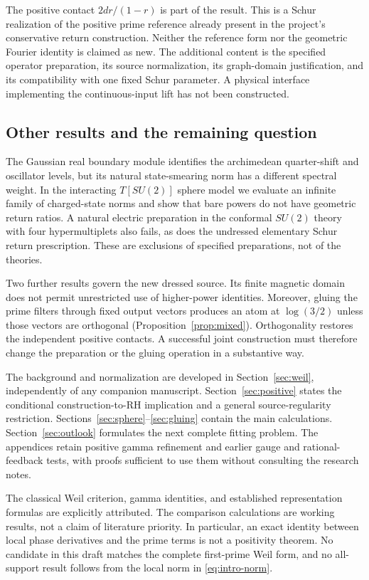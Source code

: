 The positive contact $2dr/(1-r)$ is part of the result. This is a Schur
realization of the positive prime reference already present in the
project's conservative return construction. Neither the reference form
nor the geometric Fourier identity is claimed as new. The additional
content is the specified operator preparation, its source normalization,
its graph-domain justification, and its compatibility with one fixed
Schur parameter. A physical interface implementing the continuous-input
lift has not been constructed.

\subsection{Other results and the remaining question}
The Gaussian real boundary module identifies the archimedean
quarter-shift and oscillator levels, but its natural state-smearing norm
has a different spectral weight. In the interacting $T[SU(2)]$ sphere
model we evaluate an infinite family of charged-state norms and show
that bare powers do not have geometric return ratios. A natural electric
preparation in the conformal $SU(2)$ theory with four hypermultiplets
also fails, as does the undressed elementary Schur return prescription.
These are exclusions of specified preparations, not of the theories.

Two further results govern the new dressed source. Its finite magnetic
domain does not permit unrestricted use of higher-power identities.
Moreover, gluing the prime filters through fixed output vectors produces
an atom at $\log(3/2)$ unless those vectors are orthogonal
(Proposition~\ref{prop:mixed}). Orthogonality restores the independent
positive contacts. A successful joint construction must therefore change
the preparation or the gluing operation in a substantive way.

The background and normalization are developed in
Section~\ref{sec:weil}, independently of any companion manuscript.
Section~\ref{sec:positive} states the conditional construction-to-RH
implication and a general source-regularity restriction.
Sections~\ref{sec:sphere}--\ref{sec:gluing} contain the main calculations.
Section~\ref{sec:outlook} formulates the next complete fitting problem.
The appendices retain positive gamma refinement and earlier gauge and
rational-feedback tests, with proofs sufficient to use them without
consulting the research notes.

The classical Weil criterion, gamma identities, and established
representation formulas are explicitly attributed. The comparison
calculations are working results, not a claim of literature priority.
In particular, an exact identity between local phase derivatives and
the prime terms is not a positivity theorem. No candidate in this draft
matches the complete first-prime Weil form, and no all-support result
follows from the local norm in \eqref{eq:intro-norm}.

